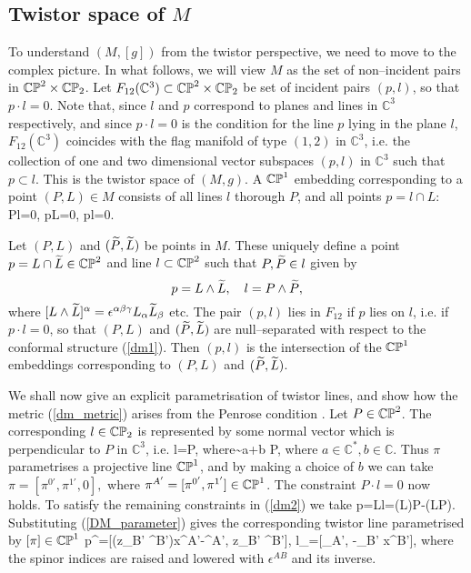 \subsection{Twistor space of $M$}
\label{twist_SSS}
To understand $(M,[g])$ from the twistor perspective, we need to move to the complex picture. In what follows, we will view $M$ as the set of non--incident pairs in $\mathbb{CP}^2\times\mathbb{CP}_2$. Let $F_{12}(\mathbb{C}^3)\subset \mathbb{CP}^2\times {\mathbb{CP}_2}$ be set of incident pairs 
$(p, l)$, so that $p\cdot l=0$. Note that, since $l$ and $p$ correspond to planes and lines in $\mathbb{C}^3$ respectively, and since $p\cdot l=0$ is the condition for the line $p$ lying in the plane $l$, $F_{12}(\mathbb{C}^3)$ coincides with the flag manifold of type $(1,2)$ in $\mathbb{C}^3$, i.e. the collection of one and two dimensional vector subspaces $(p,l)$ in $\mathbb{C}^3$ such that $p\subset l$. This is the twistor space of $(M, g)$.
A $\mathbb{CP}^1$ embedding corresponding to a point $(P, L)\in M$
consists of all lines $l$ thorough $P$, and all points
$p=l\cap L$:
\be
\label{dm2}
P\cdot l=0, \quad p\cdot L=0, \quad p\cdot l=0.
\ee

Let $(P, L)$ and $(\widetilde{P}, \widetilde{L})$ be points in $M$. These uniquely define a point $p=L\cap\widetilde{L}\in\mathbb{CP}^2$ and line $l\subset\mathbb{CP}^2$ such that $P,\widetilde{P}\in l$ given by
\[
p=L\wedge \widetilde{L}, \quad l=P\wedge \widetilde{P},
\]
where $[L\wedge\widetilde{L}]^{\alpha}=\epsilon^{\alpha\beta\gamma}L_{\alpha}\widetilde{L}_{\beta}$ etc.
The pair $(p,l)$ lies in $F_{12}$ if $p$ lies on $l$, i.e. if $p\cdot l=0$, so that $(P, L)$ and $(\widetilde{P}, \widetilde{L})$ are null--separated with respect to the conformal structure
(\ref{dm1}). Then $(p,l)$ is the intersection of the $\mathbb{CP}^1$ embeddings corresponding to $(P, L)$ and $(\widetilde{P}, \widetilde{L})$. %

We shall now give an explicit parametrisation of twistor lines, and show how 
the metric (\ref{dm_metric}) arises from the Penrose condition 
\cite{penrose,ward}.
Let $P\in \mathbb{CP}^2$. The corresponding $l\in \mathbb{CP}_2$ is represented by some normal vector which is perpendicular to $P$ in $\mathbb{C}^3$, i.e.
\be \label{eq:l=Pwedgepi}
l=P\wedge \pi, \quad \mbox{where}\quad  \pi\sim a\pi+b P,
\ee
where $a\in \mathbb{C}^*, b\in \mathbb{C}$. Thus $\pi$ parametrises a projective line $\mathbb{CP}^1$,
and by making a choice of $b$ we can take
$
\pi=[\pi^{0'}, \pi^{1'}, 0], 
$ where $\pi^{A'}=[\pi^{0'}, \pi^{1'}]\in \mathbb{CP}^1$. The constraint $P\cdot l=0$ now holds.
To satisfy the remaining constraints in (\ref{dm2}) we take
\be \label{eq:p=Lwedgel}
p=L\wedge l=(L\cdot\pi)P-(L\cdot P)\pi.
\ee
Substituting (\ref{DM_parameter}) gives 
the corresponding twistor line parametrised by $[\pi]\in\mathbb{CP}^1$ 
\be
\label{sl3curves}
p^{\alpha}=[(z_{B'} \pi^{B'})x^{A'}-\pi^{A'}, z_{B'} \pi^{B'}], \quad l_\alpha=[\pi_{A'}, -\pi_{B'} x^{B'}],
\ee
where the spinor indices are raised and lowered with $\epsilon^{AB}$ and its inverse.

